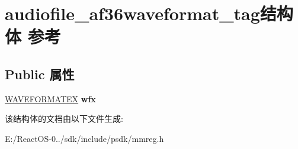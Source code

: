 \hypertarget{structaudiofile__af36waveformat__tag}{}\section{audiofile\+\_\+af36waveformat\+\_\+tag结构体 参考}
\label{structaudiofile__af36waveformat__tag}
\subsection*{Public 属性}
\begin{DoxyCompactItemize}
\item 
\mbox{\label{structaudiofile__af36waveformat__tag_a679e18509b433e225bed755a6d2a48cd}} 
\hyperlink{struct_w_a_v_e_f_o_r_m_a_t_e_x}{W\+A\+V\+E\+F\+O\+R\+M\+A\+T\+EX} {\bfseries wfx}
\end{DoxyCompactItemize}


该结构体的文档由以下文件生成\+:\begin{DoxyCompactItemize}
\item 
E\+:/\+React\+O\+S-\/0../sdk/include/psdk/mmreg.\+h\end{DoxyCompactItemize}
